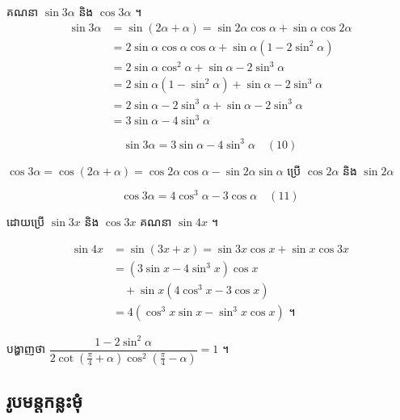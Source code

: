 \begin{example}[ឧទាហរណ៍ ៩]
គណនា $\sin 3\alpha$ និង $\cos 3\alpha$ ។
\[
\begin{aligned}
\sin 3\alpha &= \sin(2\alpha + \alpha) = \sin 2\alpha\cos\alpha + \sin\alpha\cos 2\alpha\\
&= 2\sin\alpha\cos\alpha\cos\alpha + \sin\alpha(1 - 2\sin^2\alpha)\\
&= 2\sin\alpha\cos^2\alpha + \sin\alpha - 2\sin^3\alpha\\
&= 2\sin\alpha(1 - \sin^2\alpha) + \sin\alpha - 2\sin^3\alpha\\
&= 2\sin\alpha - 2\sin^3\alpha + \sin\alpha - 2\sin^3\alpha\\
&= 3\sin\alpha - 4\sin^3\alpha
\end{aligned}
\]
\end{example}
\begin{formulaBox}[ដូច្នេះ]
\[ \sin 3\alpha = 3\sin\alpha - 4\sin^3\alpha \quad (10) \]
\end{formulaBox}
$\cos 3\alpha = \cos(2\alpha + \alpha) = \cos 2\alpha\cos\alpha - \sin 2\alpha\sin\alpha$ ប្រើ $\cos 2\alpha$ និង $\sin 2\alpha$
\begin{formulaBox}[ដូច្នេះ]
\[ \cos 3\alpha = 4\cos^3\alpha - 3\cos\alpha \quad (11) \]
\end{formulaBox}

\begin{example}[លំហាត់គំរូ ៥]
ដោយប្រើ $\sin 3x$ និង $\cos 3x$ គណនា $\sin 4x$ ។
\end{example}
\ans
\[
\begin{aligned}
\sin 4x &= \sin(3x + x) = \sin 3x\cos x + \sin x\cos 3x\\
&= (3\sin x - 4\sin^3 x)\cos x\\
&\quad + \sin x(4\cos^3 x - 3\cos x)\\
&= 4(\cos^3 x\sin x - \sin^3 x\cos x) \text{ ។}
\end{aligned}
\]

\begin{pro}
បង្ហាញថា $\dfrac{1 - 2\sin^2\alpha}{2\cot\left(\frac{\pi}{4} + \alpha\right)\cos^2\left(\frac{\pi}{4} - \alpha\right)} = 1$ ។
\end{pro}

\subsection{រូបមន្តកន្លះមុំ}

